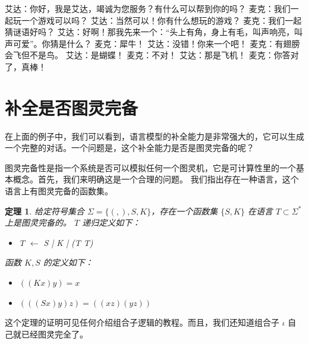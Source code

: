 \documentclass[a4paper,12pt]{article}
\numberwithin{problem}{section}
\numberwithin{definition}{section}
\numberwithin{lemma}{section}
\numberwithin{proposition}{section}
\newtheorem{theorem}{定理}
\numberwithin{theorem}{section}
\numberwithin{grammar}{section}
\numberwithin{program}{section}
\numberwithin{convention}{section}
\numberwithin{corollary}{section}
\begin{document}
\begin{displayquote}
艾达：你好，我是艾达，竭诚为您服务？有什么可以帮到你的吗？\newline
麦克：我们一起玩一个游戏可以吗？\newline
艾达：当然可以！你有什么想玩的游戏？\newline
麦克：我们一起猜谜语好吗？\newline
艾达：好啊！那我先来一个：“头上有角，身上有毛，叫声响亮，叫声可爱”。你猜是什么？\newline
麦克：犀牛！\newline
艾达：没错！你来一个吧！\newline
麦克：有翅膀会飞但不是鸟。\newline
艾达：是蝴蝶！\newline
麦克：不对！\newline
艾达：那是飞机！\newline
麦克：你答对了，真棒！\newline
\end{displayquote}

\section{补全是否图灵完备}

在上面的例子中，我们可以看到，语言模型的补全能力是非常强大的，它可以生成一个完整的对话。一个问题是，这个补全能力是否是图灵完备的呢？

图灵完备性是指一个系统是否可以模拟任何一个图灵机，它是可计算性里的一个基本概念。首先，我们来明确这是一个合理的问题。
我们指出存在一种语言，这个语言上有图灵完备的函数集。

\begin{theorem}\label{thm:tm}
给定符号集合 $\Sigma = \{(, ), S, K\}$，存在一个函数集 $\{S, K\}$ 在语言 $T \subset \Sigma^*$ 上是图灵完备的。
$T$ 递归定义如下：
\begin{itemize}
    \item T $\leftarrow$ S | K | (T T)
\end{itemize}
函数 $K, S$ 的定义如下：
\begin{itemize}
    \item $((K x) y) = x$
    \item $(((S x) y) z) = ((x z) (y z))$
\end{itemize}
\end{theorem}

这个定理的证明可见任何介绍组合子逻辑的教程。而且，我们还知道组合子 $\iota$ 自己就已经图灵完全了。
\end{document}
